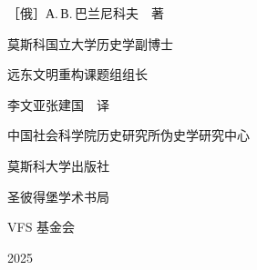 \vspace{18mm}

{\large ［俄］А.\,В.\,巴兰尼科夫\ \ 著\par}
\vspace{2mm}
{\small\color{graphite} 莫斯科国立大学历史学副博士\par}
\vspace{1mm}
{\small\color{graphite} 远东文明重构课题组组长\par}

\vspace{11mm}

{\large 李\quad 文\quad 亚\qquad 张\quad 建\quad 国\ \ 译\par}
\vspace{2mm}
{\small\color{graphite} 中国社会科学院历史研究所伪史学研究中心\par}

\vfill

{\small\sffamily 莫斯科大学出版社\par}
{\small\sffamily 圣彼得堡学术书局\par}
{\small\sffamily VFS 基金会\par}
\vspace{3mm}
{\footnotesize 2025\par}
\endgroup
\clearpage

